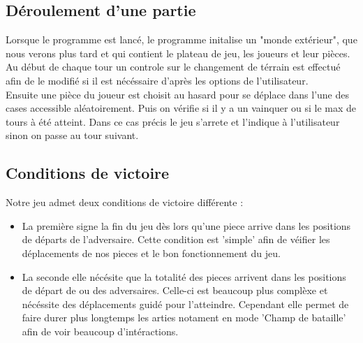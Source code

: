         \subsection{Déroulement d'une partie}
            Lorsque le programme est lancé, le programme initalise un "monde extérieur", que nous verons plus tard et qui contient le plateau de jeu, les joueurs et leur pièces. \\
            \newline
            Au début de chaque tour un controle sur le changement de térrain est effectué afin de le modifié si il est nécéssaire d'après les options de l'utilisateur. \\
            Ensuite une pièce du joueur est choisit au hasard pour se déplace dans l'une des cases accessible aléatoirement. Puis on vérifie si il y a un vainquer  ou si le max de tours à été atteint. Dans ce cas précis le jeu s'arrete et l'indique à l'utilisateur sinon on passe au tour suivant.
            
        \subsection{Conditions de victoire}
            Notre jeu admet deux conditions de victoire différente :\\
            \begin{itemize}
                \item La première signe la fin du jeu dès lors qu'une piece arrive dans les positions de départs de l'adversaire. Cette condition est 'simple' afin de véifier les déplacements de nos pieces et le bon fonctionnement du jeu.\\
                \item La seconde elle nécésite que la totalité des pieces arrivent dans les positions de départ de ou des adversaires. Celle-ci est beaucoup plus complèxe et nécéssite des déplacements guidé pour l'atteindre. Cependant elle permet de faire durer plus longtemps les arties notament en mode 'Champ de bataille' afin de voir beaucoup d'intéractions.
            \end{itemize}